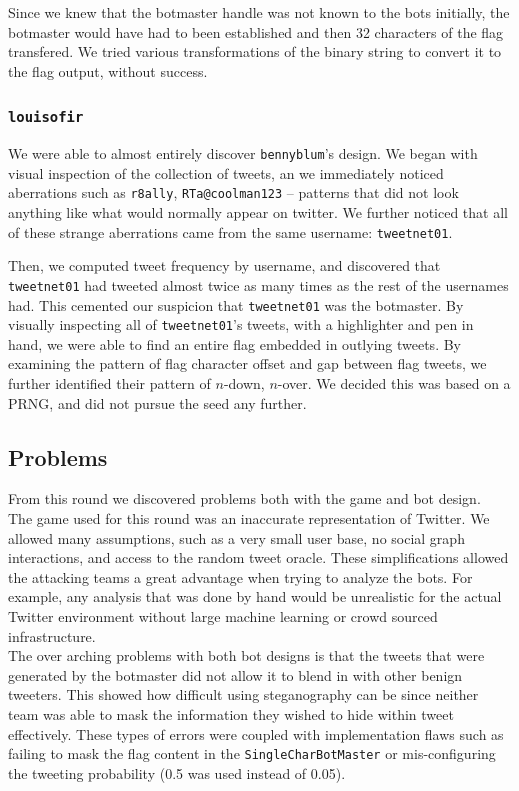 \documentclass[11pt, oneside]{article} %
\numberwithin{equation}{section} %
\numberwithin{figure}{section} %
\numberwithin{table}{section} %
\renewcommand{\c}[1]{\texttt{#1}}
\newcommand{\code}[1]{\c{#1}}
\newcommand{\teambb}{\c{bennyblum}}
\newcommand{\teamol}{\c{louisofir}}
\begin{document}
			Since we knew that the botmaster handle was not known to the bots initially, the botmaster would have had to been established and then 32 characters of the flag transfered. We tried various transformations of the binary string to convert it to the flag output, without success. 

		\subsubsection{\teamol{}}
	We were able to almost entirely discover \teambb{}'s design. We began with visual inspection of the collection of tweets,
	an we immediately noticed aberrations such as \code{r8ally}, \code{RTa@coolman123} -- patterns that did not look anything
	like what would normally appear on twitter. We further noticed that all of these strange aberrations came from the same
	username: \code{tweetnet01}.

	Then, we computed tweet frequency by username, and discovered that \code{tweetnet01} had tweeted almost twice as many times
	as the rest of the usernames had. This cemented our suspicion that \code{tweetnet01} was the botmaster. By visually inspecting
	all of \code{tweetnet01}'s tweets, with a highlighter and pen in hand, we were able to find an entire flag embedded in
	outlying tweets. By examining the pattern of flag character offset and gap between flag tweets, we further identified their
	pattern of $n$-down, $n$-over. We decided this was based on a PRNG, and did not pursue the seed any further.

	\subsection{Problems}
		From this round we discovered problems both with the game and bot design. \\

		The game used for this round was an inaccurate representation of Twitter. We allowed many assumptions, such as a very small user base, no social graph interactions, and access to the random tweet oracle. These simplifications allowed the attacking teams a great advantage when trying to analyze the bots. For example, any analysis that was done by hand would be unrealistic for the actual Twitter environment without large machine learning or crowd sourced infrastructure. \\ 
		
		The over arching problems with both bot designs is that the tweets that were generated by the botmaster did not allow it to blend in with other benign tweeters. This showed how difficult using steganography can be since neither team was able to mask the information they wished to hide within tweet effectively. These types of errors were coupled with implementation flaws such as failing to mask the flag content in the \c{SingleCharBotMaster} or mis-configuring the tweeting probability (0.5 was used instead of 0.05). \\
\end{document}
